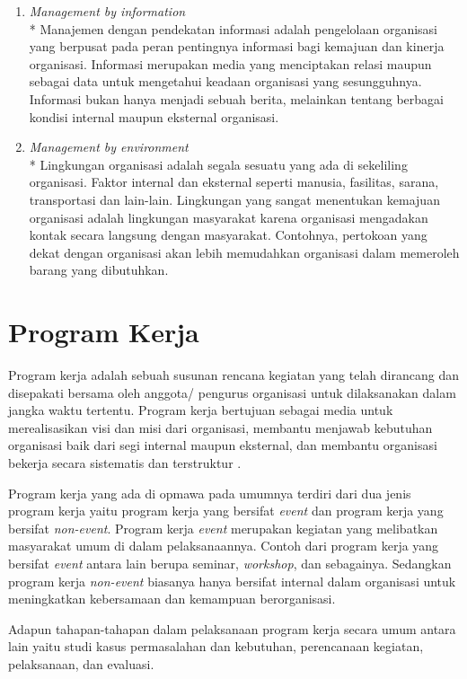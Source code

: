 \begin{enumerate}
	\item \emph{Management by information} \\*
	Manajemen dengan pendekatan informasi adalah pengelolaan organisasi yang berpusat pada peran pentingnya informasi bagi kemajuan dan kinerja organisasi. Informasi merupakan media yang menciptakan relasi maupun sebagai data untuk mengetahui keadaan organisasi yang sesungguhnya. Informasi bukan hanya menjadi sebuah berita, melainkan tentang berbagai kondisi internal maupun eksternal organisasi.
	
	\item \emph{Management by environment} \\*
	Lingkungan organisasi adalah segala sesuatu yang ada di sekeliling organisasi. Faktor internal dan eksternal seperti manusia, fasilitas, sarana, transportasi dan lain-lain. Lingkungan yang sangat menentukan kemajuan organisasi adalah lingkungan masyarakat karena organisasi mengadakan kontak secara langsung dengan masyarakat. Contohnya, pertokoan yang dekat dengan organisasi akan lebih memudahkan organisasi dalam memeroleh barang yang dibutuhkan.
\end{enumerate}

\section{Program Kerja}

Program kerja adalah sebuah susunan rencana kegiatan yang telah dirancang dan disepakati bersama oleh anggota/ pengurus organisasi untuk dilaksanakan dalam jangka waktu tertentu. Program kerja bertujuan sebagai media untuk merealisasikan visi dan misi dari organisasi, membantu menjawab kebutuhan organisasi baik dari segi internal maupun eksternal, dan membantu organisasi bekerja secara sistematis dan terstruktur \cite{dosen}.

Program kerja yang ada di opmawa pada umumnya terdiri dari dua jenis program kerja yaitu program kerja yang bersifat \emph{event} dan program kerja yang bersifat \emph{non-event}. Program kerja \emph{event} merupakan kegiatan yang melibatkan masyarakat umum di dalam pelaksanaannya. Contoh dari program kerja  yang bersifat \emph{event} antara lain berupa seminar, \emph{workshop}, dan sebagainya. Sedangkan program kerja \emph{non-event} biasanya hanya bersifat internal dalam organisasi untuk meningkatkan kebersamaan dan kemampuan berorganisasi.

Adapun tahapan-tahapan dalam pelaksanaan program kerja secara umum antara lain yaitu studi kasus permasalahan dan kebutuhan, perencanaan kegiatan, pelaksanaan, dan evaluasi.

